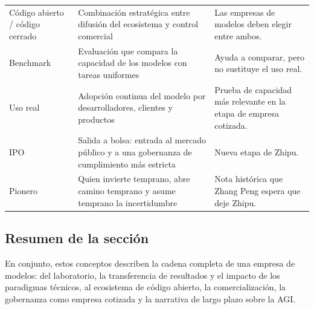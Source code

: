 \begin{longtable}{p{}p{}p{}}
Código abierto / código cerrado & Combinación estratégica entre difusión del ecosistema y control comercial & Las empresas de modelos deben elegir entre ambos. \\
Benchmark & Evaluación que compara la capacidad de los modelos con tareas uniformes & Ayuda a comparar, pero no sustituye el uso real. \\
Uso real & Adopción continua del modelo por desarrolladores, clientes y productos & Prueba de capacidad más relevante en la etapa de empresa cotizada. \\
IPO & Salida a bolsa: entrada al mercado público y a una gobernanza de cumplimiento más estricta & Nueva etapa de Zhipu. \\
Pionero & Quien invierte temprano, abre camino temprano y asume temprano la incertidumbre & Nota histórica que Zhang Peng espera que deje Zhipu. \\
\bottomrule
\end{longtable}

\subsection{Resumen de la sección}

En conjunto, estos conceptos describen la cadena completa de una empresa de modelos: del laboratorio, la transferencia de resultados y el impacto de los paradigmas técnicos, al ecosistema de código abierto, la comercialización, la gobernanza como empresa cotizada y la narrativa de largo plazo sobre la AGI.
